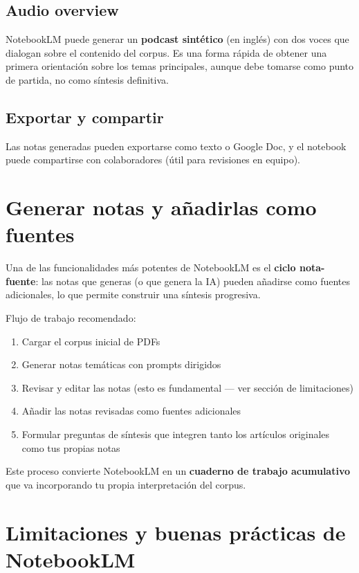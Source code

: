 \documentclass[
]{book}
\providecommand{\tightlist}{%
  \setlength{\itemsep}{0pt}\setlength{\parskip}{0pt}}
\begin{document}
\subsection{Audio overview}\label{audio-overview}

NotebookLM puede generar un \textbf{podcast sintético} (en inglés) con dos voces que dialogan sobre el contenido del corpus. Es una forma rápida de obtener una primera orientación sobre los temas principales, aunque debe tomarse como punto de partida, no como síntesis definitiva.

\subsection{Exportar y compartir}\label{exportar-y-compartir}

Las notas generadas pueden exportarse como texto o Google Doc, y el notebook puede compartirse con colaboradores (útil para revisiones en equipo).

\section{Generar notas y añadirlas como fuentes}\label{generar-notas-y-auxf1adirlas-como-fuentes}

Una de las funcionalidades más potentes de NotebookLM es el \textbf{ciclo nota-fuente}: las notas que generas (o que genera la IA) pueden añadirse como fuentes adicionales, lo que permite construir una síntesis progresiva.

Flujo de trabajo recomendado:

\begin{enumerate}
\def\labelenumi{\arabic{enumi}.}
\tightlist
\item
  Cargar el corpus inicial de PDFs
\item
  Generar notas temáticas con prompts dirigidos
\item
  Revisar y editar las notas (esto es fundamental --- ver sección de limitaciones)
\item
  Añadir las notas revisadas como fuentes adicionales
\item
  Formular preguntas de síntesis que integren tanto los artículos originales como tus propias notas
\end{enumerate}

Este proceso convierte NotebookLM en un \textbf{cuaderno de trabajo acumulativo} que va incorporando tu propia interpretación del corpus.

\section{Limitaciones y buenas prácticas de NotebookLM}\label{limitaciones-y-buenas-pruxe1cticas-de-notebooklm}
\end{document}
